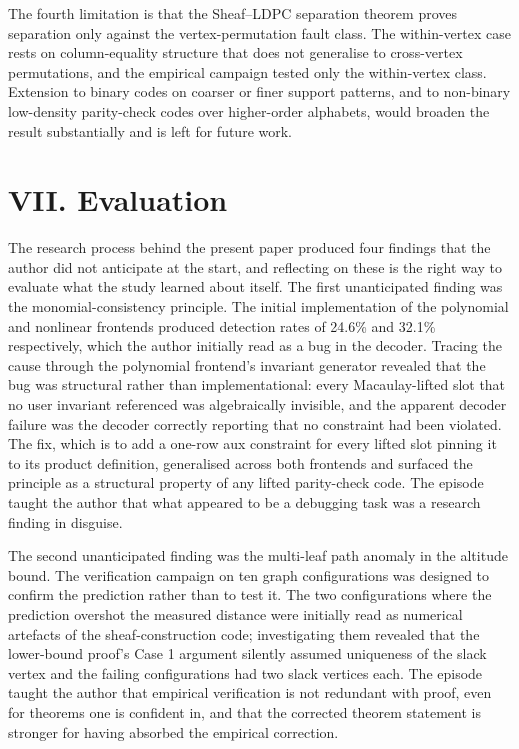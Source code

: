 \documentclass[12pt,a4paper]{article}
\theoremstyle{plain}
\theoremstyle{definition}
\begin{document}
The fourth limitation is that the Sheaf--LDPC separation theorem proves separation only against the vertex-permutation fault class. The within-vertex case rests on column-equality structure that does not generalise to cross-vertex permutations, and the empirical campaign tested only the within-vertex class. Extension to binary codes on coarser or finer support patterns, and to non-binary low-density parity-check codes over higher-order alphabets, would broaden the result substantially and is left for future work.

\section{VII. Evaluation}

The research process behind the present paper produced four findings that the author did not anticipate at the start, and reflecting on these is the right way to evaluate what the study learned about itself. The first unanticipated finding was the monomial-consistency principle. The initial implementation of the polynomial and nonlinear frontends produced detection rates of 24.6\% and 32.1\% respectively, which the author initially read as a bug in the decoder. Tracing the cause through the polynomial frontend's invariant generator revealed that the bug was structural rather than implementational: every Macaulay-lifted slot that no user invariant referenced was algebraically invisible, and the apparent decoder failure was the decoder correctly reporting that no constraint had been violated. The fix, which is to add a one-row aux constraint for every lifted slot pinning it to its product definition, generalised across both frontends and surfaced the principle as a structural property of any lifted parity-check code. The episode taught the author that what appeared to be a debugging task was a research finding in disguise.

The second unanticipated finding was the multi-leaf path anomaly in the altitude bound. The verification campaign on ten graph configurations was designed to confirm the prediction rather than to test it. The two configurations where the prediction overshot the measured distance were initially read as numerical artefacts of the sheaf-construction code; investigating them revealed that the lower-bound proof's Case 1 argument silently assumed uniqueness of the slack vertex and the failing configurations had two slack vertices each. The episode taught the author that empirical verification is not redundant with proof, even for theorems one is confident in, and that the corrected theorem statement is stronger for having absorbed the empirical correction.
\end{document}
